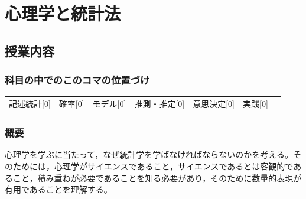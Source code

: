 \section{心理学と統計法}
\label{D1_lesson01}
\subsection{授業内容}
\subsubsection{科目の中でのこのコマの位置づけ}
\begin{tabular}[t]{ccccccc}
記述統計[0] & 確率[0] & モデル[0] & 推測・推定[0] & 意思決定[0] & 実践[0]
\end{tabular}
\subsubsection{概要}
心理学を学ぶに当たって，なぜ統計学を学ばなければならないのかを考える。そのためには，心理学がサイエンスであること，サイエンスであるとは客観的であること，積み重ねが必要であることを知る必要があり，そのために数量的表現が有用であることを理解する。
